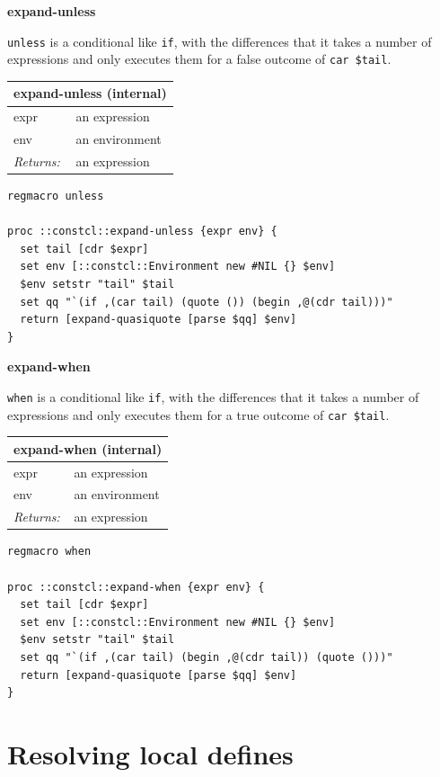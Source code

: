 \documentclass[twoside,9pt]{report}
\begin{document}
\textbf{expand-unless}


\texttt{unless} is a conditional like \texttt{if}, with the differences that it takes a number of expressions and only executes them for a false outcome of \texttt{car \$tail}.

\begin{tabular}{ |l l| }
\hline
\multicolumn{2}{|l|}{expand-unless (internal)} \\
\hline
expr & an expression \\
env & an environment \\
\textit{Returns:} & an expression \\
\hline
\end{tabular}

\noindent\makebox[\linewidth]{\rule{\linewidth}{0.4pt}}
\begin{lstlisting}
regmacro unless
 
proc ::constcl::expand-unless {expr env} {
  set tail [cdr $expr]
  set env [::constcl::Environment new #NIL {} $env]
  $env setstr "tail" $tail
  set qq "`(if ,(car tail) (quote ()) (begin ,@(cdr tail)))"
  return [expand-quasiquote [parse $qq] $env]
}
\end{lstlisting}
\noindent\makebox[\linewidth]{\rule{\linewidth}{0.4pt}}

\textbf{expand-when}


\texttt{when} is a conditional like \texttt{if}, with the differences that it takes a number of expressions and only executes them for a true outcome of \texttt{car \$tail}.

\begin{tabular}{ |l l| }
\hline
\multicolumn{2}{|l|}{expand-when (internal)} \\
\hline
expr & an expression \\
env & an environment \\
\textit{Returns:} & an expression \\
\hline
\end{tabular}

\noindent\makebox[\linewidth]{\rule{\linewidth}{0.4pt}}
\begin{lstlisting}
regmacro when
 
proc ::constcl::expand-when {expr env} {
  set tail [cdr $expr]
  set env [::constcl::Environment new #NIL {} $env]
  $env setstr "tail" $tail
  set qq "`(if ,(car tail) (begin ,@(cdr tail)) (quote ()))"
  return [expand-quasiquote [parse $qq] $env]
}
\end{lstlisting}
\noindent\makebox[\linewidth]{\rule{\linewidth}{0.4pt}}
\section{Resolving local defines}
\label{resolving-local-defines}
\end{document}

